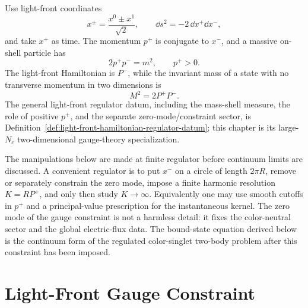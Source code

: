 Use light-front coordinates
\begin{equation}
  x^\pm=\frac{x^0\pm x^1}{\sqrt2},
  \qquad
  \dd s^2=-2\,\dd x^+\dd x^- ,
  \label{eq:qcd2-light-front-coordinates}
\end{equation}
and take \(x^+\) as time.  The momentum \(p^+\) is conjugate to \(x^-\), and
a massive on-shell particle has
\[
  2p^+p^-=m^2,\qquad p^+>0 .
\]
The light-front Hamiltonian is \(P^-\), while the invariant mass of a state
with no transverse momentum in two dimensions is
\begin{equation}
  M^2=2P^+P^- .
  \label{eq:qcd2-light-front-mass}
\end{equation}
The general light-front regulator datum, including the mass-shell measure,
the role of positive \(p^+\), and the separate zero-mode/constraint sector,
is Definition~\ref{def:light-front-hamiltonian-regulator-datum}; this
chapter is its large-\(N_c\) two-dimensional gauge-theory specialization.

The manipulations below are made at finite regulator before continuum limits
are discussed.  A convenient regulator is to put \(x^-\) on a circle of
length \(2\pi R\), remove or separately constrain the zero mode, impose a
finite harmonic resolution \(K=RP^+\), and only then study \(K\to\infty\).
Equivalently one may use smooth cutoffs in \(p^+\) and a principal-value
prescription for the instantaneous kernel.  The zero mode of the gauge
constraint is not a harmless detail: it fixes the color-neutral sector and
the global electric-flux data.  The bound-state equation derived below is the
continuum form of the regulated color-singlet two-body problem after this
constraint has been imposed.

\section{Light-Front Gauge Constraint}

